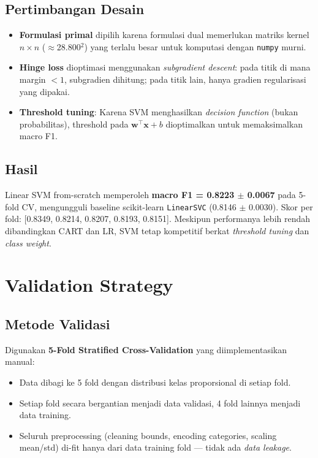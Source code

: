 \documentclass[12pt,a4paper]{article}
\begin{document}
\subsection{Pertimbangan Desain}

\begin{itemize}
    \item \textbf{Formulasi primal} dipilih karena formulasi dual memerlukan matriks kernel $n \times n$ ($\approx$28.800$^2$) yang terlalu besar untuk komputasi dengan \texttt{numpy} murni.
    \item \textbf{Hinge loss} dioptimasi menggunakan \textit{subgradient descent}: pada titik di mana margin $< 1$, subgradien dihitung; pada titik lain, hanya gradien regularisasi yang dipakai.
    \item \textbf{Threshold tuning}: Karena SVM menghasilkan \textit{decision function} (bukan probabilitas), threshold pada $\mathbf{w}^\top \mathbf{x} + b$ dioptimalkan untuk memaksimalkan macro F1.
\end{itemize}

\subsection{Hasil}

Linear SVM from-scratch memperoleh \textbf{macro F1 = 0.8223 $\pm$ 0.0067} pada 5-fold CV, mengungguli baseline scikit-learn \texttt{LinearSVC} (0.8146 $\pm$ 0.0030). Skor per fold: [0.8349, 0.8214, 0.8207, 0.8193, 0.8151]. Meskipun performanya lebih rendah dibandingkan CART dan LR, SVM tetap kompetitif berkat \textit{threshold tuning} dan \textit{class weight}.

\section{Validation Strategy}
\label{sec:validation}

\subsection{Metode Validasi}

Digunakan \textbf{5-Fold Stratified Cross-Validation} yang diimplementasikan manual:
\begin{itemize}
    \item Data dibagi ke 5 fold dengan distribusi kelas proporsional di setiap fold.
    \item Setiap fold secara bergantian menjadi data validasi, 4 fold lainnya menjadi data training.
    \item Seluruh preprocessing (cleaning bounds, encoding categories, scaling mean/std) di-fit hanya dari data training fold --- tidak ada \textit{data leakage}.
\end{itemize}
\end{document}
